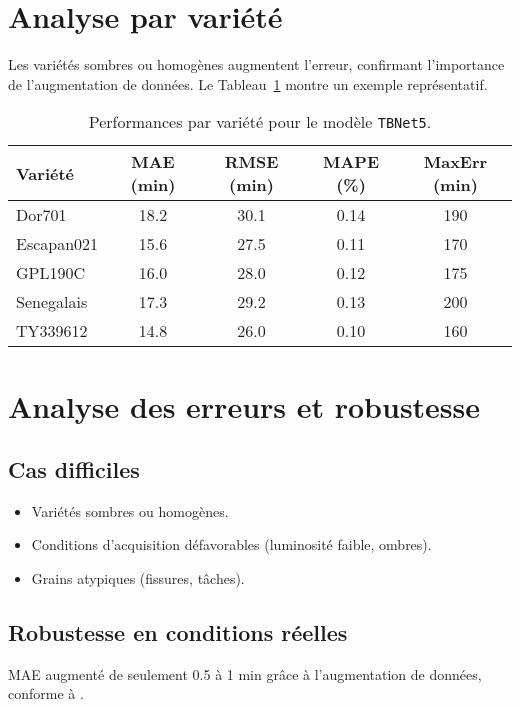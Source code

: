 \section{Analyse par variété}
\label{subsec:analyse_variete}

Les variétés sombres ou homogènes augmentent l’erreur, confirmant l’importance de l’augmentation de données. Le Tableau~\ref{tab:variete_stats} montre un exemple représentatif.

\begin{table}[H]
\centering
\caption{Performances par variété pour le modèle \texttt{TBNet5}.}
\label{tab:variete_stats}
\begin{tabular}{|l|c|c|c|c|}
\hline
\textbf{Variété} & \textbf{MAE (min)} & \textbf{RMSE (min)} & \textbf{MAPE (\%)} & \textbf{MaxErr (min)} \\
\hline
Dor701 & 18.2 & 30.1 & 0.14 & 190 \\
Escapan021 & 15.6 & 27.5 & 0.11 & 170 \\
GPL190C & 16.0 & 28.0 & 0.12 & 175 \\
Senegalais & 17.3 & 29.2 & 0.13 & 200 \\
TY339612 & 14.8 & 26.0 & 0.10 & 160 \\
\hline
\end{tabular}
\end{table}

\section{Analyse des erreurs et robustesse}
\label{sec:erreurs_robustesse}

\subsection{Cas difficiles}
\begin{itemize}
    \item Variétés sombres ou homogènes.  
    \item Conditions d’acquisition défavorables (luminosité faible, ombres).  
    \item Grains atypiques (fissures, tâches).  
\end{itemize}

\subsection{Robustesse en conditions réelles}
MAE augmenté de seulement 0.5 à 1 min grâce à l’augmentation de données, conforme à \cite{tastan2023}.

